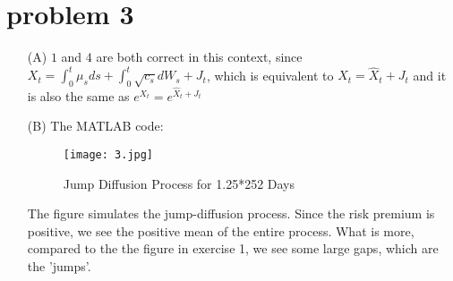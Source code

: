 \documentclass[11pt]{amsart}
\theoremstyle{definition}
\begin{document}
\clearpage
\section*{problem 3}
\begin{enumerate}
    \item [(A)] $1$ and $4$ are both correct in this context, since $X_{t}=\int_{0}^{t} \mu_{s} ds + \int_{0}^{t} \sqrt{c_{s}} dW_{s} + J_{t}$, which is equivalent to $X_{t}=\widehat{X}_{t}+J_{t}$ and it is also the same as $e^{X_{t}}=e^{\widehat{X}_{t}+J_{t}}$
\end{enumerate}
\begin{enumerate}
    \item [(B)] The MATLAB code:
 
\begin{figure}[htbp]
\centering
\texttt{[image: 3.jpg]}
\caption{Jump Diffusion Process for 1.25*252 Days}
\end{figure}
The figure simulates the jump-diffusion process. Since the risk premium is positive, we see the positive mean of the entire process. What is more, compared to the the figure in exercise 1, we see some large gaps, which are the 'jumps'.
\end{enumerate}

\clearpage
\end{document}
